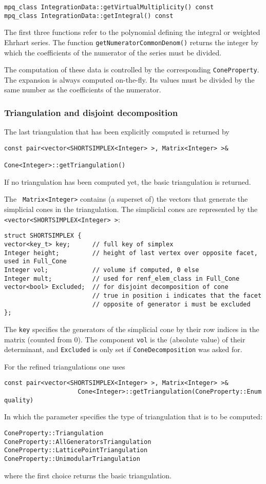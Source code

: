 \documentclass[12pt,a4paper]{scrartcl}
\theoremstyle{definition}
\begin{document}
\begin{small}
\begin{Verbatim}
mpq_class IntegrationData::getVirtualMultiplicity() const
mpq_class IntegrationData::getIntegral() const
\end{Verbatim}

The first three functions refer to the polynomial defining the integral or weighted Ehrhart series. The function \verb|getNumeratorCommonDenom()| returns the integer by which the coefficients of the numerator of the series must be divided.

The computation of these data is controlled by the corresponding \verb|ConeProperty|. The expansion is always computed on-the-fly. Its values must be divided by the same number as the coefficients of the numerator.

\subsubsection{Triangulation and disjoint decomposition}

The last triangulation that has been explicitly computed is returned by
\begin{Verbatim}
const pair<vector<SHORTSIMPLEX<Integer> >, Matrix<Integer> >&
                                                Cone<Integer>::getTriangulation()
\end{Verbatim}
If no triangulation has been computed yet, the basic triangulation is returned.

The \verb| Matrix<Integer>| contains (a superset of) the vectors that generate the simplicial cones in the triangulation. The simplicial cones are represented by the \verb|<vector<SHORTSIMPLEX<Integer> >|:
\begin{Verbatim}
struct SHORTSIMPLEX {
vector<key_t> key;      // full key of simplex
Integer height;         // height of last vertex over opposite facet, used in Full_Cone
Integer vol;            // volume if computed, 0 else
Integer mult;           // used for renf_elem_class in Full_Cone
vector<bool> Excluded;  // for disjoint decomposition of cone
                        // true in position i indicates that the facet
                        // opposite of generator i must be excluded
};
\end{Verbatim}
The \verb|key| specifies the generators of the simplicial cone by their row indices in the matrix (counted from $0$). The component \verb|vol| is the (absolute value) of their determinant, and \verb|Excluded| is only set if \verb|ConeDecomposition| was asked for.

For the refined triangulations one uses
\begin{Verbatim}
const pair<vector<SHORTSIMPLEX<Integer> >, Matrix<Integer> >& 
                    Cone<Integer>::getTriangulation(ConeProperty::Enum quality)
\end{Verbatim}
In which the parameter specifies the type of triangulation that is to be computed:
\begin{Verbatim}
ConeProperty::Triangulation
ConeProperty::AllGeneratorsTriangulation
ConeProperty::LatticePointTriangulation
ConeProperty::UnimodularTriangulation
\end{Verbatim}
where the first choice returns the basic triangulation.


\end{small}
\end{document}
